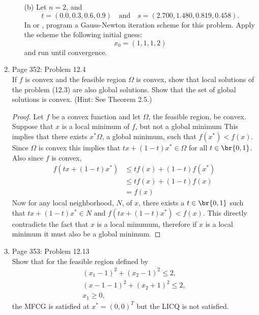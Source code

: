 \documentclass[11pt, oneside]{article}
\begin{document}
\begin{enumerate}
\begin{enumerate}
      \item[(b)]
        Let $n = 2$, and
        \[
          t = (0.0, 0.3, 0.6, 0.9) \quad \text{and} \quad s = (2.700, 1.480, 0.819, 0.458).
        \]
        In \MATLAB or \PYTHON, program a Gauss-Newton iteration scheme for this
        problem.
        Apply the scheme the following initial guess:
        \[
          x_0 = (1, 1, 1, 2)
        \]
        and run until convergence.
    \end{enumerate}

  \item %
    Page 352: Problem 12.4 \\
    If $f$ is convex and the feasible region $\Omega$ is convex, show that local
    solutions of the problem (12.3) are also global solutions.
    Show that the set of global solutions is convex.
    (Hint: See Theorem 2.5.)

    \begin{proof}
      Let $f$ be a convex function and let $\Omega$, the feasible region, be
      convex.
      Suppose that $x$ is a local minimum of $f$, but not a global minimum
      This implies that there exists $x^* \Omega$, a global minimum, such that
      $f(x^*) < f(x)$.
      Since $\Omega$ is convex this implies that $tx + (1-t)x^* \in \Omega$
      for all $t \in \br{0, 1}$.
      Also since $f$ is convex,
      \begin{align*}
        f(tx + (1-t)x^*) &\le tf(x) + (1-t)f(x^*) \\
        &\le tf(x) + (1-t)f(x) \\
        &= f(x)
      \end{align*}
      Now for any local neighborhood, $N$, of $x$, there exists a
      $t \in \br{0, 1}$ such that $tx + (1-t)x^* \in N$ and
      $f(tx + (1-t)x^*) < f(x)$.
      This directly contradicts the fact that $x$ is a local minumum, therefore
      if $x$ is a local minimum it must also be a global minimum.
    \end{proof}

  \item %
    Page 353: Problem 12.13 \\
    Show that for the feasible region defined by
    \begin{align*}
      (x_1 - 1)^2 + (x_2 - 1)^2 \le 2, \\
      (x-1 - 1)^2 + (x_2 + 1)^2 \le 2, \\
      x_1 \ge 0,
    \end{align*}
    the MFCG is satisfied at $x^* = (0, 0)^T$ but the LICQ is not satisfied.


\end{enumerate}
\end{document}
